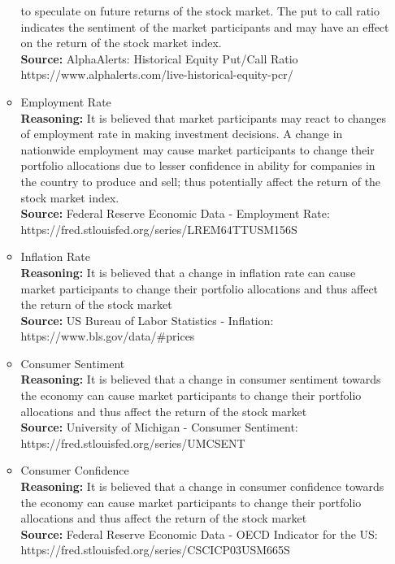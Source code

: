 \begin{itemize}
\begin{itemize}
        to speculate on future returns of the stock market. The put to call ratio indicates the sentiment
        of the market participants and may have an effect on the return of the stock market index.\\
        \textbf{Source:} AlphaAlerts: Historical Equity Put/Call Ratio\\
        https://www.alphalerts.com/live-historical-equity-pcr/
        \item Employment Rate\\
        \textbf{Reasoning:} It is believed that market participants may react to changes of employment
        rate in making investment decisions. A change in nationwide employment may cause market participants
        to change their portfolio allocations due to lesser confidence in ability for companies in the country
        to produce and sell; thus potentially affect the return of the stock market index.\\
        \textbf{Source:} Federal Reserve Economic Data - Employment Rate:\\
        https://fred.stlouisfed.org/series/LREM64TTUSM156S
        \item Inflation Rate\\
        \textbf{Reasoning:} It is believed that a change in inflation rate can cause market participants
        to change their portfolio allocations and thus affect the return of the stock market\\
        \textbf{Source:} US Bureau of Labor Statistics - Inflation:\\
        https://www.bls.gov/data/\#prices
        \item Consumer Sentiment\\
        \textbf{Reasoning:} It is believed that a change in consumer sentiment towards the economy
        can cause market participants to change their portfolio allocations and thus affect the
        return of the stock market\\
        \textbf{Source:} University of Michigan - Consumer Sentiment:\\
        https://fred.stlouisfed.org/series/UMCSENT
        \item Consumer Confidence\\
        \textbf{Reasoning:} It is believed that a change in consumer confidence towards the economy
        can cause market participants to change their portfolio allocations and thus affect the return
        of the stock market\\
        \textbf{Source:} Federal Reserve Economic Data - OECD Indicator for the US:\\
        https://fred.stlouisfed.org/series/CSCICP03USM665S
    \end{itemize}
\end{itemize}



